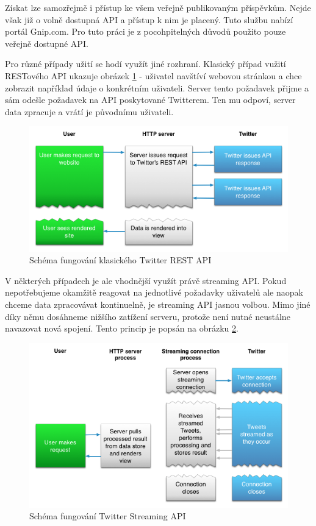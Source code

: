 \documentclass[thesis=B,czech]{FITthesis}[2012/06/26]
\begin{document}
	Získat lze samozřejmě i přístup ke všem veřejně publikovaným příspěvkům. Nejde však již o volně dostupná API a přístup k nim je placený. Tuto službu nabízí portál Gnip.com\cite{gnip}. Pro tuto práci je z pocohpitelných důvodů použito pouze veřejně dostupné API. 
	
	Pro různé případy užití se hodí využít jiné rozhraní. Klasický případ vužití RESTového API ukazuje obrázek \ref{fig:twitter_rest} - uživatel navštíví webovou stránkou a chce zobrazit například údaje o konkrétním uživateli. Server tento požadavek přijme a sám odešle požadavek na API poskytované Twitterem. Ten mu odpoví, server data zpracuje a vrátí je původnímu uživateli. 

\begin{figure}[ht]
   	\centering
   	\includegraphics[width=1\textwidth]{images/twitter-rest.png}
   	\caption{Schéma fungování klasického Twitter REST API\cite{twitter-rest-stream}}
   	\label{fig:twitter_rest}
\end{figure}

	V některých případech je ale vhodnější využít právě streaming API. Pokud nepotřebujeme okamžitě reagovat na jednotlivé požadavky uživatelů ale naopak chceme data zpracovávat kontinuelně, je streaming API jasnou volbou. Mimo jiné díky němu dosáhneme nižšího zatížení serveru, protože není nutné neustálne navazovat nová spojení. Tento princip je popsán na obrázku \ref{fig:twitter_streaming}. 

\begin{figure}[ht]
   	\centering
   	\includegraphics[width=1\textwidth]{images/twitter-streaming.png}
   	\caption{Schéma fungování Twitter Streaming API\cite{twitter-rest-stream}}
   	\label{fig:twitter_streaming}
\end{figure}
\end{document}
